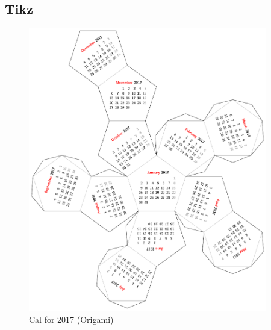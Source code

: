 \documentclass[12pt,a4paper]{article}
\begin{document}
{{	\subsection{Tikz}
	\label{tikz}
\begin{figure}[h]
    \centering
    \includegraphics[width=0.93\textwidth]{Tikz}
    \caption{Cal for 2017 (Origami)}
    \label{fig:graf}
\end{figure}
	
	\newpage
}}
\end{document}
